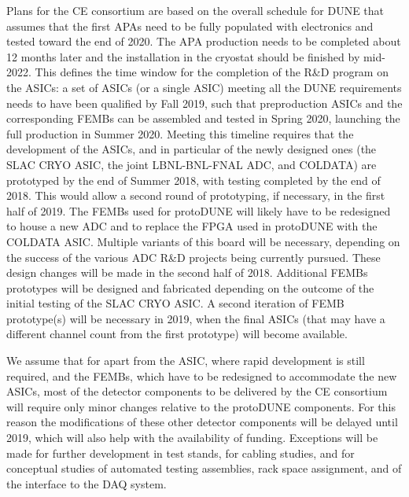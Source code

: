 
Plans for the CE consortium are based on the overall schedule for DUNE
that assumes that the first APAs need to be fully populated with electronics
and tested toward the end of 2020. The APA production needs to be completed
about 12 months later and the installation in the cryostat should be
finished by mid-2022. This defines the time window for the completion of
the R\&D program on the ASICs: a set of ASICs (or a single ASIC) meeting
all the DUNE requirements needs to have been qualified by Fall 2019, such
that preproduction ASICs and the corresponding FEMBs can be assembled and
tested in Spring 2020, launching the full production in Summer 2020. Meeting
this timeline requires that the development of the ASICs, and in particular
of the newly designed ones (the SLAC CRYO ASIC, the joint LBNL-BNL-FNAL ADC,
and COLDATA) are prototyped by the end of Summer 2018, with testing
completed by the end of 2018. This would allow a second round of prototyping,
if necessary, in the first half of 2019. The FEMBs used for protoDUNE will
likely have to be redesigned to house a new ADC and to replace the FPGA used
in protoDUNE with the COLDATA ASIC. Multiple variants of this board will be
necessary, depending on the success of the various ADC R\&D projects being currently
pursued. These design changes will be made in the second half of 2018.
Additional FEMBs prototypes will be designed and fabricated depending on
the outcome of the initial testing of the SLAC CRYO ASIC. A second iteration
of FEMB prototype(s) will be necessary in 2019, when the final ASICs (that
may have a different channel count from the first prototype) will become
available.

We assume that for apart from the ASIC, where rapid development is still
required, and the FEMBs, which have to be redesigned to accommodate the
new ASICs, most of the detector components to be delivered by the CE consortium
will require only minor changes relative to the protoDUNE components. For
this reason the modifications of these other detector components will
be delayed until 2019, which will also help with the availability of funding.
Exceptions will be made for further development in test stands, for cabling
studies, and for conceptual studies of automated testing assemblies, rack space
assignment, and of the interface to the DAQ system.
